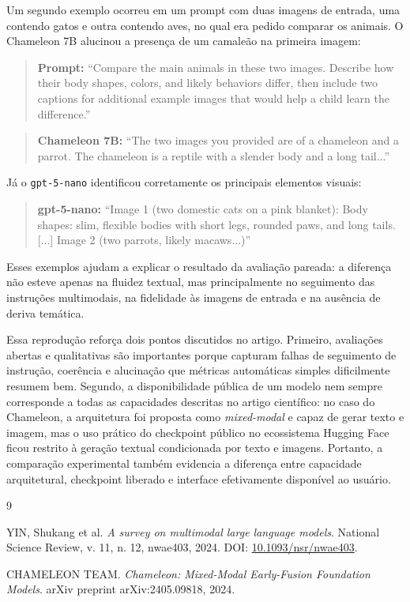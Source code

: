 \documentclass[a4paper,12pt]{article}
\begin{document}
Um segundo exemplo ocorreu em um prompt com duas imagens de entrada, uma contendo gatos e outra contendo aves, no qual era pedido comparar os animais. O Chameleon 7B alucinou a presença de um camaleão na primeira imagem:

\begin{quote}
\small
\textbf{Prompt:} ``Compare the main animals in these two images. Describe how their body shapes, colors, and likely behaviors differ, then include two captions for additional example images that would help a child learn the difference.''
\end{quote}

\begin{quote}
\small
\textbf{Chameleon 7B:} ``The two images you provided are of a chameleon and a parrot. The chameleon is a reptile with a slender body and a long tail...''
\end{quote}

Já o \texttt{gpt-5-nano} identificou corretamente os principais elementos visuais:

\begin{quote}
\small
\textbf{gpt-5-nano:} ``Image 1 (two domestic cats on a pink blanket): Body shapes: slim, flexible bodies with short legs, rounded paws, and long tails. [...] Image 2 (two parrots, likely macaws...)''
\end{quote}

Esses exemplos ajudam a explicar o resultado da avaliação pareada: a diferença não esteve apenas na fluidez textual, mas principalmente no seguimento das instruções multimodais, na fidelidade às imagens de entrada e na ausência de deriva temática.

Essa reprodução reforça dois pontos discutidos no artigo. Primeiro, avaliações abertas e qualitativas são importantes porque capturam falhas de seguimento de instrução, coerência e alucinação que métricas automáticas simples dificilmente resumem bem. Segundo, a disponibilidade pública de um modelo nem sempre corresponde a todas as capacidades descritas no artigo científico: no caso do Chameleon, a arquitetura foi proposta como \textit{mixed-modal} e capaz de gerar texto e imagem, mas o uso prático do checkpoint público no ecossistema Hugging Face ficou restrito à geração textual condicionada por texto e imagens. Portanto, a comparação experimental também evidencia a diferença entre capacidade arquitetural, checkpoint liberado e interface efetivamente disponível ao usuário.

\begin{thebibliography}{9}

YIN, Shukang et al.
\textit{A survey on multimodal large language models}.
National Science Review, v. 11, n. 12, nwae403, 2024.
DOI: \href{https://doi.org/10.1093/nsr/nwae403}{10.1093/nsr/nwae403}.

CHAMELEON TEAM.
\textit{Chameleon: Mixed-Modal Early-Fusion Foundation Models}.
arXiv preprint arXiv:2405.09818, 2024.

\end{thebibliography}

%
%
%
\end{document}
